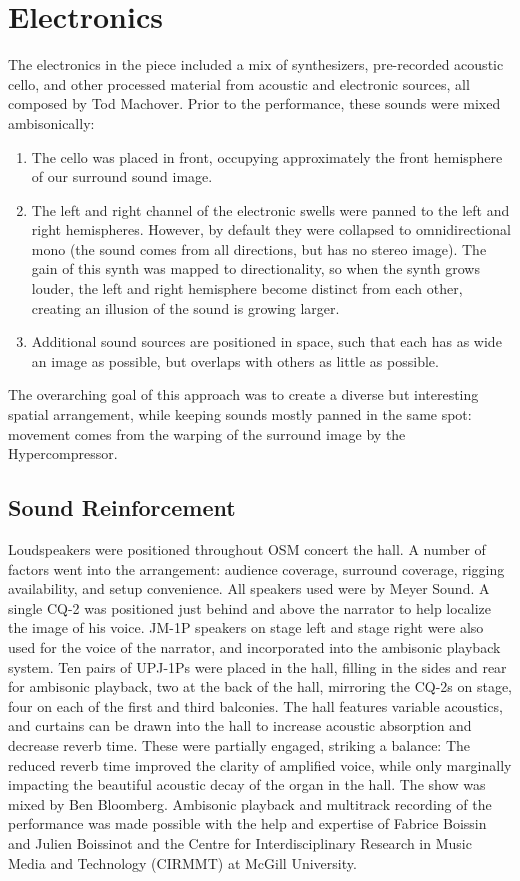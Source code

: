 \section{Electronics}
\label{sec:electronics}
The electronics in the piece included a mix of synthesizers,
pre-recorded acoustic cello, and other processed material from
acoustic and electronic sources, all composed by Tod Machover. Prior
to the performance, these sounds were mixed ambisonically:
\begin{enumerate}
\item The cello was placed in front, occupying approximately the front
  hemisphere of our surround sound image.
\item The left and right channel of the electronic swells were panned
  to the left and right hemispheres. However, by default they were
  collapsed to omnidirectional mono (the sound comes from all
  directions, but has no stereo image). The gain of this synth was
  mapped to directionality, so when the synth grows louder, the left
  and right hemisphere become distinct from each other, creating
  an illusion of the sound is growing larger.
\item Additional sound sources are positioned in space, such that each
  has as wide an image as possible, but overlaps with others as little
  as possible.
\end{enumerate}
The overarching goal of this approach was to create a diverse but
interesting spatial arrangement, while keeping sounds mostly panned in
the same spot: movement comes from the warping of the surround image
by the Hypercompressor.

\subsection{Sound Reinforcement}
\label{sec:sound-reinforcement}
Loudspeakers were positioned throughout OSM concert the hall. A number
of factors went into the arrangement: audience coverage, surround
coverage, rigging availability, and setup convenience. All speakers
used were by Meyer Sound. A
single CQ-2 was positioned just behind and above the narrator to help
localize the image of his voice.  JM-1P speakers on stage left and
stage right were also used for the voice of the narrator, and
incorporated into the ambisonic playback system. Ten pairs of UPJ-1Ps
were placed in the hall, filling in the sides and rear for ambisonic
playback, two at the back of the hall, mirroring the CQ-2s on stage,
four on each of the first and third balconies.  The hall features
variable acoustics, and curtains can be drawn into the hall to
increase acoustic absorption and decrease reverb time. These were
partially engaged, striking a balance: The reduced reverb time
improved the clarity of amplified voice, while only marginally
impacting the beautiful acoustic decay of the organ in the hall. The
show was mixed by Ben Bloomberg. Ambisonic playback and multitrack
recording of the performance was made possible with the help and
expertise of Fabrice Boissin and Julien Boissinot and the Centre for
Interdisciplinary Research in Music Media and Technology (CIRMMT) at
McGill University.

